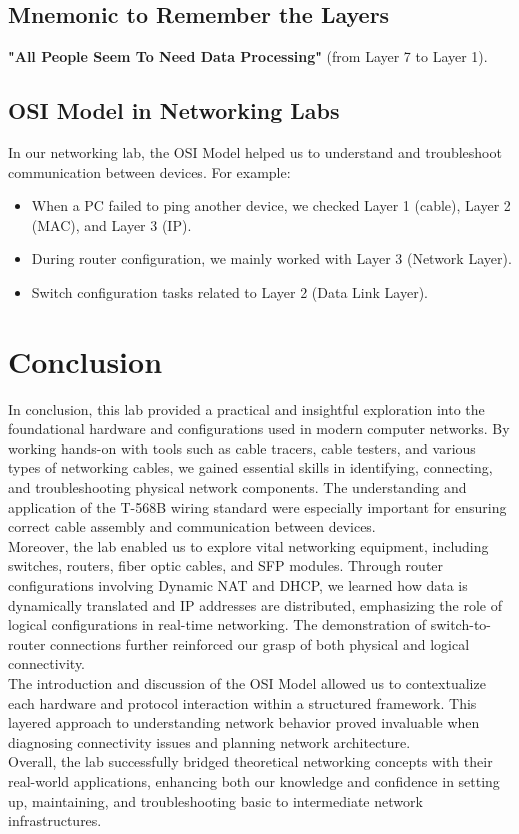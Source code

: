 \documentclass[12pt]{article}
\begin{document}
\subsection{Mnemonic to Remember the Layers}
\textbf{"All People Seem To Need Data Processing"} (from Layer 7 to Layer 1). \\

\subsection{OSI Model in Networking Labs}
In our networking lab, the OSI Model helped us to understand and troubleshoot communication between devices. For example:
\begin{itemize}
    \item When a PC failed to ping another device, we checked Layer 1 (cable), Layer 2 (MAC), and Layer 3 (IP).
    \item During router configuration, we mainly worked with Layer 3 (Network Layer).
    \item Switch configuration tasks related to Layer 2 (Data Link Layer). \\
\end{itemize}
\newpage
\section{Conclusion}
In conclusion, this lab provided a practical and insightful exploration into the foundational hardware and configurations used in modern computer networks. By working hands-on with tools such as cable tracers, cable testers, and various types of networking cables, we gained essential skills in identifying, connecting, and troubleshooting physical network components. The understanding and application of the T-568B wiring standard were especially important for ensuring correct cable assembly and communication between devices.\\
Moreover, the lab enabled us to explore vital networking equipment, including switches, routers, fiber optic cables, and SFP modules. Through router configurations involving Dynamic NAT and DHCP, we learned how data is dynamically translated and IP addresses are distributed, emphasizing the role of logical configurations in real-time networking. The demonstration of switch-to-router connections further reinforced our grasp of both physical and logical connectivity.\\
The introduction and discussion of the OSI Model allowed us to contextualize each hardware and protocol interaction within a structured framework. This layered approach to understanding network behavior proved invaluable when diagnosing connectivity issues and planning network architecture.\\
Overall, the lab successfully bridged theoretical networking concepts with their real-world applications, enhancing both our knowledge and confidence in setting up, maintaining, and troubleshooting basic to intermediate network infrastructures.\\
\end{document}
